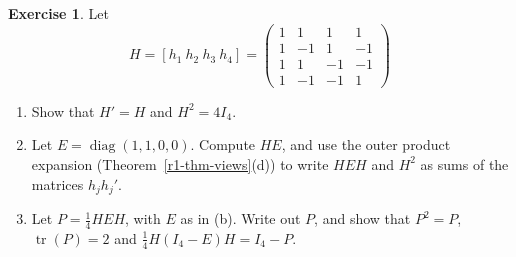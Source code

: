 \documentclass[12pt]{article}
\DeclareMathOperator{\tr}{tr}
\DeclareMathOperator{\diag}{diag}
\theoremstyle{definition}
\newtheorem{exercise}{Exercise}
\begin{document}
\begin{exercise}\label{r1-ex-hadamard}
Let
\[
H=[h_1\ h_2\ h_3\ h_4]=\begin{pmatrix}1&1&1&1\\1&-1&1&-1\\1&1&-1&-1\\1&-1&-1&1\end{pmatrix}
\]
\begin{enumerate}
\item Show that \(H'=H\) and \(H^2=4I_4\).
\item Let \(E=\diag(1,1,0,0)\). Compute \(HE\), and use the outer product expansion
(Theorem~\ref{r1-thm-views}(d)) to write \(HEH\) and \(H^2\) as sums of the matrices \(h_jh_j'\).
\item Let \(P=\frac14HEH\), with \(E\) as in (b). Write out \(P\), and show that \(P^2=P\), \(\tr(P)=2\) and
\(\frac14H(I_4-E)H=I_4-P\).
\end{enumerate}
\end{exercise}
\end{document}
